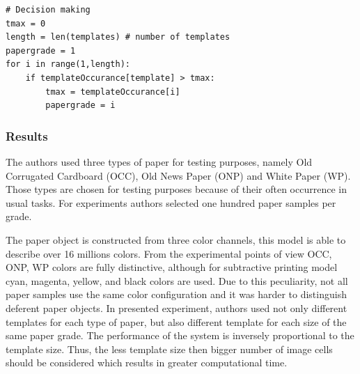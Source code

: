 \documentclass{lutmscthesis}[2010/09/22]
\begin{document}
\begin{lstlisting}[caption={Decision Making Procedure}, label={lst:decision}]
# Decision making
tmax = 0
length = len(templates) # number of templates
papergrade = 1
for i in range(1,length):
    if templateOccurance[template] > tmax:
        tmax = templateOccurance[i]
        papergrade = i
\end{lstlisting}

\subsubsection*{ Results }
The authors used three types of paper for testing
purposes, namely Old Corrugated Cardboard (OCC),
Old News Paper (ONP) and White Paper (WP). Those
types are chosen for testing purposes because of
their often occurrence in usual tasks. For experiments
authors selected one hundred paper samples per grade.

The paper object is constructed from
three color channels, this model is able to describe
over 16 millions colors. From the experimental points
of view OCC, ONP, WP colors are fully distinctive,
although for subtractive printing model cyan, magenta,
yellow, and black colors are used. Due to this peculiarity,
not all paper samples use the same color configuration
and it was harder to distinguish deferent paper objects.
In presented experiment, authors used not only different
templates for each type of paper, but also different template
for each size of the same paper grade. The performance
of the system is inversely proportional to the template
size. Thus, the less template size then bigger number of
image cells should be considered which results
in greater computational time.
\end{document}
